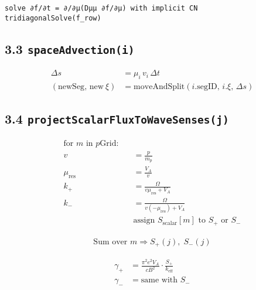 \begin{lstlisting}
solve ∂f/∂t = ∂/∂μ(Dμμ ∂f/∂μ) with implicit CN
tridiagonalSolve(f_row)
\end{lstlisting}

\subsection*{3.3 \texttt{spaceAdvection(i)}}

\begin{align*}
\Delta s &= \mu_i\, v_i\, \Delta t \\
(\text{newSeg},\, \text{new}~\xi) &= \text{moveAndSplit}(i.\text{segID},\, i.\xi,\, \Delta s)
\end{align*}

\subsection*{3.4 \texttt{projectScalarFluxToWaveSenses(j)}}

\begin{align*}
\text{for } m \text{ in } p\text{Grid:} \quad & \\
v &= \frac{p}{m_p} \\
\mu_{\text{res}} &= \frac{V_A}{v} \\
k_{+} &= \frac{\Omega}{v \mu_{\text{res}} + V_A} \\
k_{-} &= \frac{\Omega}{v (-\mu_{\text{res}}) + V_A} \\
&\text{assign } S_{\text{scalar}}[m] \text{ to } S_{+} \text{ or } S_{-}
\end{align*}

\begin{align*}
\text{Sum over } m \Rightarrow S_{+}(j),\; S_{-}(j)
\end{align*}

\begin{align*}
\gamma_{+} &= \frac{\pi^2 e^2 V_A}{c B^2} \cdot \frac{S_{+}}{k_{\text{eff}}} \\
\gamma_{-} &= \text{same with } S_{-}
\end{align*}

